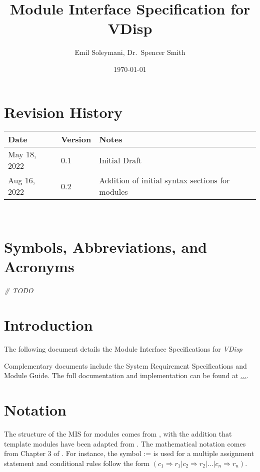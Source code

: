 \documentclass[12pt, titlepage]{article}
\begin{document}
\title{Module Interface Specification for VDisp}
\author{Emil Soleymani, Dr.~Spencer Smith}
\date{\today}
\maketitle

\section{Revision History}

\begin{tabularx}{\textwidth}{p{3cm}p{2cm}X}
\toprule {\bf Date} & {\bf Version} & {\bf Notes}\\
\midrule
May 18, 2022 & 0.1 & Initial Draft\\
Aug 16, 2022 & 0.2 & Addition of initial syntax sections for modules\\
\bottomrule
\end{tabularx}

~\newpage

\section{Symbols, Abbreviations, and Acronyms}
\emph{\# TODO}
\newpage

\tableofcontents

\newpage


\section{Introduction}

The following document details the Module Interface Specifications for
\emph{VDisp}

Complementary documents include the System Requirement Specifications
and Module Guide.  The full documentation and implementation can be
found at \url{...}.  

\section{Notation}

The structure of the MIS for modules comes from ,
with the addition that template modules have been adapted from
.  The mathematical notation comes from Chapter 3 of
.  For instance, the symbol := is used for a
multiple assignment statement and conditional rules follow the form $(c_1
\Rightarrow r_1 | c_2 \Rightarrow r_2 | ... | c_n \Rightarrow r_n )$.
\end{document}
